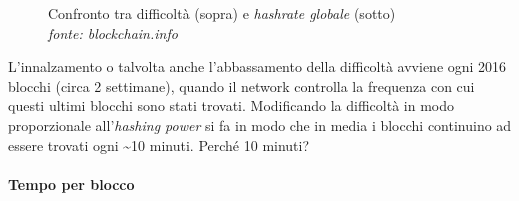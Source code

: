 \documentclass {article}
\begin{document}
\vspace {0.5cm}
\begin{figure}[htb!]
\captionsetup{width=1.4\linewidth}
\caption {Confronto tra difficoltà (sopra) e \textit{hashrate globale} (sotto)\\\textit{fonte: blockchain.info}}
\end{figure}
\vspace {0.2cm}
\noindent
%
L'innalzamento o talvolta anche l'abbassamento della difficoltà avviene ogni 2016 blocchi (circa 2 settimane), quando il network controlla la frequenza con cui questi ultimi blocchi sono stati trovati.
Modificando la difficoltà in modo proporzionale all'\textit{hashing power} si fa in modo che in media i blocchi continuino ad essere trovati ogni \textasciitilde 10 minuti. Perché 10 minuti?

\paragraph {Tempo per blocco}
\end{document}
